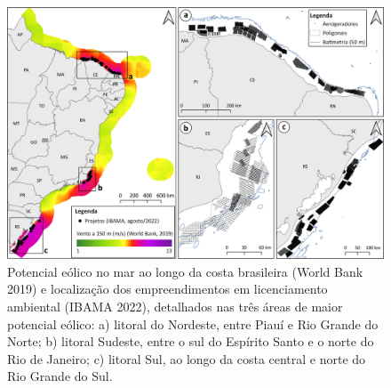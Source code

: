\documentclass[
  oneside]{scrbook}
\begin{document}
\begin{figure}[H]

{\centering \includegraphics[width=0.75\linewidth]{imagens/cap08/Figura_8.4} 

}

\caption{Potencial eólico no mar ao longo da costa brasileira (World Bank 2019) e localização dos empreendimentos em licenciamento ambiental (IBAMA 2022), detalhados nas três áreas de maior potencial eólico: a) litoral do Nordeste, entre Piauí e Rio Grande do Norte; b) litoral Sudeste, entre o sul do Espírito Santo e o norte do Rio de Janeiro; c) litoral Sul, ao longo da costa central e norte do Rio Grande do Sul.}\label{fig:64}
\end{figure}
\end{document}
